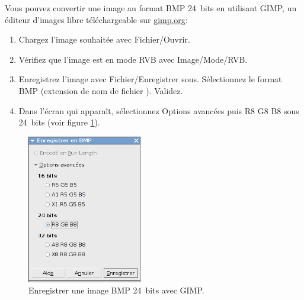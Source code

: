 Vous pouvez convertir une image au format BMP 24~bits en utilisant GIMP, un
éditeur d'images libre téléchargeable
sur \href{http://www.gimp.org/}{gimp.org}:

\begin{enumerate}
\item Chargez l'image souhaitée avec Fichier\slash{}Ouvrir.
\item Vérifiez que l'image est en mode RVB avec Image\slash{}Mode\slash{}RVB.
\item Enregistrez l'image avec Fichier\slash{}Enregistrer sous. Sélectionnez le
  format BMP (extension de nom de fichier ). Validez.
\item Dans l'écran qui apparaît, sélectionnez \og{}Options avancées\fg{}
puis \og{}R8 G8 B8\fg{} sous \og{}24~bits\fg{} (voir figure
\ref{fig:capture_gimp_bmp}).
\end{enumerate}

\begin{figure}[h]
  \centering
  \includegraphics[width=5cm]{capture-gimp-bmp}
  \caption{Enregistrer une image BMP 24~bits avec GIMP.}
  \label{fig:capture_gimp_bmp}
\end{figure}




